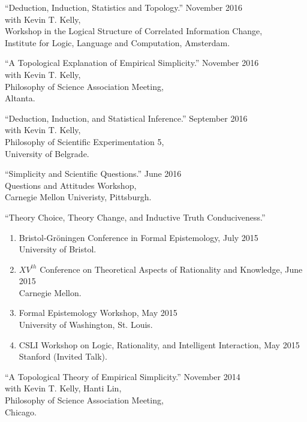 \documentclass[12pt]{res} %
\begin{document}
\begin{resume}
``Deduction, Induction, Statistics and Topology.'' \hfill November 2016\\
with Kevin T. Kelly,\\
 Workshop in the Logical Structure of Correlated Information Change,\\ Institute for Logic, Language and Computation, Amsterdam.

``A Topological Explanation of Empirical Simplicity.'' \hfill November 2016\\
with Kevin T. Kelly,\\
Philosophy of Science Association Meeting, \\
Altanta.

``Deduction, Induction, and Statistical Inference.'' \hfill September 2016\\
with Kevin T. Kelly,\\
Philosophy of Scientific Experimentation 5,\\
University of Belgrade.

``Simplicity and Scientific Questions.'' \hfill June 2016\\ 
Questions and Attitudes Workshop,\\
Carnegie Mellon Univeristy, Pittsburgh.

``Theory Choice, Theory Change, and Inductive Truth Conduciveness.''\\
\begin{enumerate}
\item Bristol-Gr\"{o}ningen Conference in Formal Epistemology, \hfill July 2015 \\University of Bristol. 
\item $XV^{th}$ Conference on Theoretical Aspects of Rationality and Knowledge, \hfill June 2015\\ Carnegie Mellon. 
\item Formal Epistemology Workshop, \hfill May 2015\\ University of Washington, St. Louis. 
\item CSLI Workshop on Logic, Rationality, and Intelligent Interaction, \hfill May 2015\\ Stanford (Invited Talk). 
\end{enumerate}

``A Topological Theory of Empirical Simplicity.'' \hfill November 2014\\
with Kevin T. Kelly, Hanti Lin,\\
Philosophy of Science Association Meeting,\\
Chicago.


\end{resume}
\end{document}
